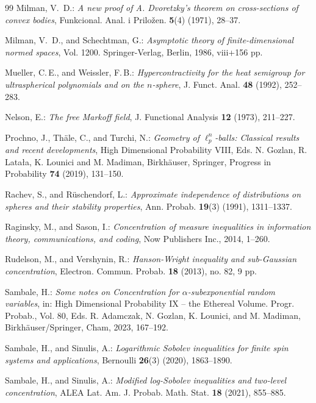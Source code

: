 \documentclass[a4paper,12pt]{amsart}
\numberwithin{equation}{section}
\theoremstyle{remark}
\begin{document}
\begin{thebibliography}{99}
	 Milman, V.\, D.: \emph{A new proof of A. Dvoretzky's theorem on cross-sections of convex bodies}, Funkcional. Anal. i Prilo\v{z}en. \textbf{5}(4) (1971), 28--37.
	
	 Milman, V.\, D., and Schechtman, G.: \emph{Asymptotic theory of finite-dimensional normed spaces}, Vol. 1200. Springer-Verlag, Berlin, 1986, viii+156 pp.
	
	 Mueller, C.\,E., and Weissler, F.\,B.: \emph{Hypercontractivity for the heat semigroup for ultraspherical polynomials and on the $n$-sphere}, J. Funct. Anal. \textbf{48} (1992), 252--283.
	
	 Nelson, E.: \emph{The free Markoff field}, J. Functional Analysis \textbf{12} (1973), 211--227.
	
	 Prochno, J., Th\"{a}le, C., and Turchi, N.: \emph{Geometry of $\ell_p^n$-balls: Classical results and recent developments}, High Dimensional Probability VIII, Eds. N. Gozlan, R. Lata{\l}a, K. Lounici and M. Madiman, Birkh\"{a}user, Springer, Progress in Probability \textbf{74} (2019), 131--150.
	
	 Rachev, S., and R\"{u}schendorf, L.: \emph{Approximate independence of distributions on spheres and their stability properties}, Ann. Probab. \textbf{19}(3) (1991), 1311--1337.
	
	 Raginsky, M., and Sason, I.: \emph{Concentration of measure inequalities in information theory, communications, and coding}, Now Publishers Inc., 2014, 1--260.
	
	 Rudelson, M., and Vershynin, R.: \emph{Hanson-Wright inequality and sub-Gaussian concentration}, Electron. Commun. Probab. \textbf{18} (2013), no. 82, 9 pp.
	
	 Sambale, H.: \emph{Some notes on Concentration for $\alpha$-subexponential random variables}, in: High Dimensional Probability IX -- the Ethereal Volume. Progr. Probab., Vol. 80, Eds. R. Adamczak, N. Gozlan, K. Lounici, and M. Madiman, Birkh\"{a}user/Springer, Cham, 2023, 167--192.
	
	 Sambale, H., and Sinulis, A.: \emph{Logarithmic Sobolev inequalities for finite spin systems and applications}, Bernoulli \textbf{26}(3) (2020), 1863--1890.
	
	 Sambale, H., and Sinulis, A.: \emph{Modified log-{S}obolev inequalities and two-level concentration}, ALEA Lat. Am. J. Probab. Math. Stat. \textbf{18} (2021), 855--885.
	

\end{thebibliography}
\end{document}
